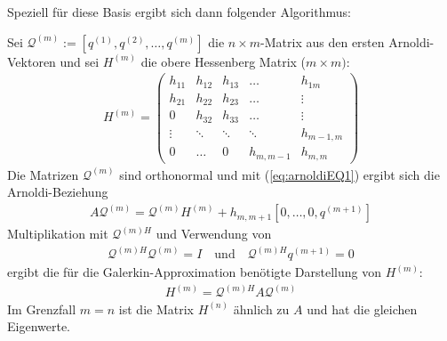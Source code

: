 Speziell für diese Basis ergibt sich dann folgender Algorithmus:


Sei $\mathcal{Q}^{(m)} := [q^{(1)},q^{(2)},\dots,q^{(m)}] $ die $n\times m$-Matrix aus den ersten Arnoldi-Vektoren  
und sei $H^{(m)}$ die obere Hessenberg Matrix ($m\times m)$:
%
\begin{align*}
  H^{(m)} 
  = \begin{pmatrix}
  h_{11} & h_{12} & h_{13} & \dots & h_{1m} \\
  h_{21} & h_{22} & h_{23} & \dots & \vdots \\
  0 & h_{32} & h_{33} & \dots & \vdots \\
  \vdots & \ddots &  \ddots &   \ddots &  h_{m-1,m} \\
  0 &\dots & 0 & h_{m,m-1} & h_{m,m}
\end{pmatrix}
\end{align*}
%
Die Matrizen $\mathcal{Q}^{(m)}$ sind orthonormal und mit (\ref{eq:arnoldiEQ1}) ergibt sich die Arnoldi-Beziehung 
%
\begin{align*}
  A\mathcal{Q}^{(m)} 
  = \mathcal{Q}^{(m)} H^{(m)} + h_{m,m+1}[0,\dots,0,q^{(m+1)}]
  \tag{3}\label{eq:arnoldiEQ3}
\end{align*}
%
Multiplikation mit ${\mathcal{Q}^{(m)H}}$ und Verwendung von 
%
\begin{align*}
  {\mathcal{Q}^{(m)H}} \mathcal{Q}^{(m)} = I \quad \text{und}\quad {\mathcal{Q}^{(m)H}} q^{(m+1)}=0
\end{align*}
%
ergibt die für die Galerkin-Approximation benötigte Darstellung von $H^{(m)}$:
%
\begin{align*}
  H^{(m)} = {\mathcal{Q}^{(m)H}} A \mathcal{Q}^{(m)}
\end{align*}
%
Im Grenzfall $m=n$ ist die Matrix $H^{(n)}$ ähnlich zu $A$ und hat die gleichen Eigenwerte. 

